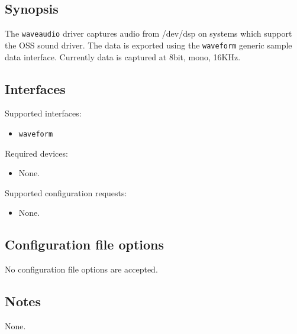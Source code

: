 \subsection*{Synopsis}
The {\tt waveaudio} driver captures audio from /dev/dsp on systems
which support the OSS sound driver. The data is exported using the
{\tt waveform} generic sample data interface. Currently data is
captured at 8bit, mono, 16KHz.

\subsection*{Interfaces}

\noindent Supported interfaces:

\begin{itemize}
\item {\tt waveform}
\end{itemize}

\noindent Required devices:
\begin{itemize}
\item None.
\end{itemize}

\noindent Supported configuration requests:
\begin{itemize}
\item None.
\end{itemize}


\subsection*{Configuration file options}
No configuration file options are accepted.

\subsection*{Notes}
None.
